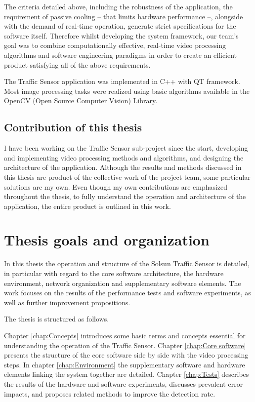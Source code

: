 The criteria detailed above, including the robustness of the application, the requirement of passive cooling -- that limits hardware performance --, alongside with the demand of real-time operation, generate strict specifications for the software itself.
Therefore whilst developing the system framework, our team's goal was to combine computationally effective, real-time video processing algorithms and software engineering paradigms in order to create an efficient product satisfying all of the above requirements.

The Traffic Sensor application was implemented in C++ with QT framework.
Most image processing tasks were realized using basic algorithms available in the OpenCV (Open Source Computer Vision) Library.

\subsection{Contribution of this thesis}\label{sec:contribution_of_the_thesis}

I have been working on the Traffic Sensor sub-project since the start, developing and implementing video processing methods and algorithms, and designing the architecture of the application.
Although the results and methods discussed in this thesis are product of the collective work of the project team, some particular solutions are my own. 
Even though my own contributions are emphasized throughout the thesis, to fully understand the operation and architecture of the application, the entire product is outlined in this work.

\section{Thesis goals and organization}
In this thesis the operation and structure of the Solsun Traffic Sensor is detailed, in particular with regard to the core software architecture, the hardware environment, network organization and supplementary software elements.
The work focuses on the results of the performance tests and software experiments, as well as further improvement propositions.

The thesis is structured as follows.

Chapter \ref{chap:Concepts} introduces some basic terms and concepts essential for understanding the operation of the Traffic Sensor. 
Chapter \ref{chap:Core software} presents the structure of the core software side by side with the video processing steps.
In chapter \ref{chap:Environment} the supplementary software and hardware elements linking the system together are detailed.
Chapter \ref{chap:Tests} describes the results of the hardware and software experiments, discusses prevalent error impacts, and proposes related methods to improve the detection rate.
